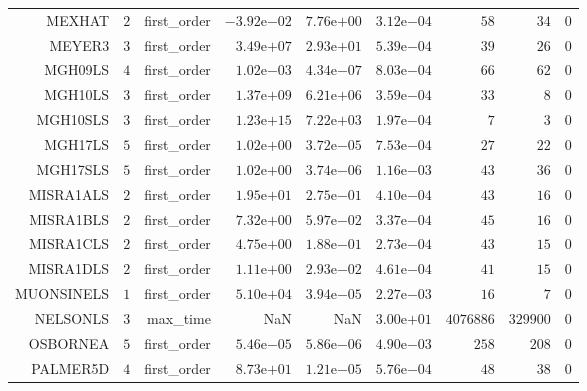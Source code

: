 \begin{longtable}{rrrrrrrrr}
MEXHAT & \(     2\) & first\_order & \(-3.92\)e\(-02\) & \( 7.76\)e\(+00\) & \( 3.12\)e\(-04\) & \(    58\) & \(    34\) & \(     0\) \\
MEYER3 & \(     3\) & first\_order & \( 3.49\)e\(+07\) & \( 2.93\)e\(+01\) & \( 5.39\)e\(-04\) & \(    39\) & \(    26\) & \(     0\) \\
MGH09LS & \(     4\) & first\_order & \( 1.02\)e\(-03\) & \( 4.34\)e\(-07\) & \( 8.03\)e\(-04\) & \(    66\) & \(    62\) & \(     0\) \\
MGH10LS & \(     3\) & first\_order & \( 1.37\)e\(+09\) & \( 6.21\)e\(+06\) & \( 3.59\)e\(-04\) & \(    33\) & \(     8\) & \(     0\) \\
MGH10SLS & \(     3\) & first\_order & \( 1.23\)e\(+15\) & \( 7.22\)e\(+03\) & \( 1.97\)e\(-04\) & \(     7\) & \(     3\) & \(     0\) \\
MGH17LS & \(     5\) & first\_order & \( 1.02\)e\(+00\) & \( 3.72\)e\(-05\) & \( 7.53\)e\(-04\) & \(    27\) & \(    22\) & \(     0\) \\
MGH17SLS & \(     5\) & first\_order & \( 1.02\)e\(+00\) & \( 3.74\)e\(-06\) & \( 1.16\)e\(-03\) & \(    43\) & \(    36\) & \(     0\) \\
MISRA1ALS & \(     2\) & first\_order & \( 1.95\)e\(+01\) & \( 2.75\)e\(-01\) & \( 4.10\)e\(-04\) & \(    43\) & \(    16\) & \(     0\) \\
MISRA1BLS & \(     2\) & first\_order & \( 7.32\)e\(+00\) & \( 5.97\)e\(-02\) & \( 3.37\)e\(-04\) & \(    45\) & \(    16\) & \(     0\) \\
MISRA1CLS & \(     2\) & first\_order & \( 4.75\)e\(+00\) & \( 1.88\)e\(-01\) & \( 2.73\)e\(-04\) & \(    43\) & \(    15\) & \(     0\) \\
MISRA1DLS & \(     2\) & first\_order & \( 1.11\)e\(+00\) & \( 2.93\)e\(-02\) & \( 4.61\)e\(-04\) & \(    41\) & \(    15\) & \(     0\) \\
MUONSINELS & \(     1\) & first\_order & \( 5.10\)e\(+04\) & \( 3.94\)e\(-05\) & \( 2.27\)e\(-03\) & \(    16\) & \(     7\) & \(     0\) \\
NELSONLS & \(     3\) & max\_time &       NaN &       NaN & \( 3.00\)e\(+01\) & \(4076886\) & \(329900\) & \(     0\) \\
OSBORNEA & \(     5\) & first\_order & \( 5.46\)e\(-05\) & \( 5.86\)e\(-06\) & \( 4.90\)e\(-03\) & \(   258\) & \(   208\) & \(     0\) \\
PALMER5D & \(     4\) & first\_order & \( 8.73\)e\(+01\) & \( 1.21\)e\(-05\) & \( 5.76\)e\(-04\) & \(    48\) & \(    38\) & \(     0\) \\

\end{longtable}
